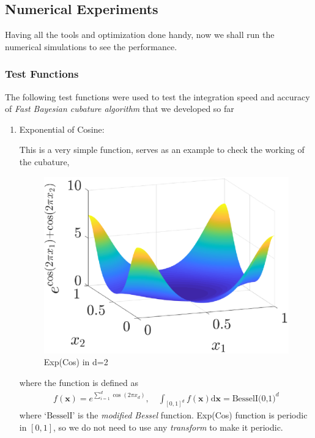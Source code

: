 \documentclass[twocolumn]{svjour3}          %
\newcommand{\bm}[1]{\boldsymbol{#1}}
\newcommand{\dif}[1]{\text{d}{#1}}
\newcommand{\vx}{\bm{x}}
\newcommand{\dvx}{\dif{\bm{x}}}
\begin{document}
\subsection{Numerical Experiments}
\label{sec:numerical_experiments}

Having all the tools and optimization done handy, now we shall run the numerical simulations to see the performance.

\subsubsection{Test Functions}

The following test functions were used to test the integration speed and accuracy of \textit{Fast Bayesian cubature algorithm} that we developed so far

\begin{enumerate}
\item Exponential of Cosine: 

This is a very simple function, serves as an example to check the working of the cubature,
\begin{figure}
	\centering
	\includegraphics[width=0.95\linewidth]{"figures/ExpCos"}
	\caption[Exp(Cos):]{Exp(Cos) in d=2}
	\label{fig:ExpCos}
\end{figure}
where the function is defined as
\begin{multline*}
f(\vx) = e^{\sum_{i=1}^d\cos(2 \pi x_d)},  
\quad
\int_{[0,1]^d} f(\vx) \dvx = \text{BesselI(0,1)}^d
\end{multline*}
where `$\text{BesselI}$' is the \textit{modified Bessel} function. Exp(Cos) function is periodic in $[0,1]$, so we do not need to use any \textit{transform} to make it periodic.








\end{enumerate}
\end{document}
